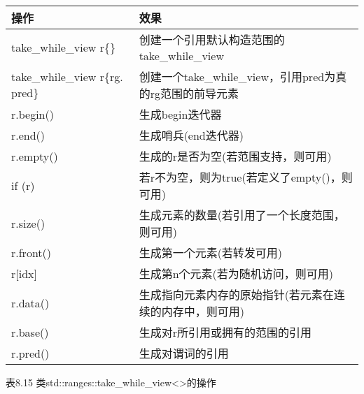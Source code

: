 \begin{longtable}[c]{|l|l|}
\hline
\textbf{操作} & \textbf{效果}                                                        \\ \hline
\endfirsthead
%
\endhead
%
take\_while\_view r\{\}         & 创建一个引用默认构造范围的take\_while\_view                             \\ \hline
take\_while\_view r\{rg. pred\} & 创建一个take\_while\_view，引用pred为真的rg范围的前导元素 \\ \hline
r.begin()          & 生成begin迭代器                                              \\ \hline
r.end()            & 生成哨兵(end迭代器)                                      \\ \hline
r.empty()          & 生成的r是否为空(若范围支持，则可用)         \\ \hline
if (r)             & 若r不为空，则为true(若定义了empty()，则可用)                \\ \hline
r.size()           & 生成元素的数量(若引用了一个长度范围，则可用) \\ \hline
r.front()          & 生成第一个元素(若转发可用)                     \\ \hline
r{[}idx{]}         & 生成第n个元素(若为随机访问，则可用)                    \\ \hline
r.data()           & 生成指向元素内存的原始指针(若元素在连续的内存中，则可用)  \\ \hline
r.base()           & 生成对r所引用或拥有的范围的引用               \\ \hline
r.pred()           & 生成对谓词的引用                                    \\ \hline
\end{longtable}

\begin{center}
表8.15 类std::ranges::take\_while\_view<>的操作
\end{center}


